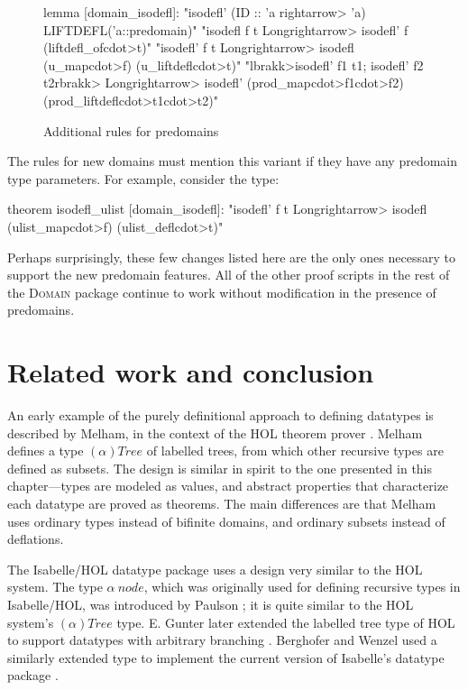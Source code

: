 \begin{figure}
\begin{isacode}
lemma [domain_isodefl]:
  "isodefl' (ID :: 'a \<rightarrow> 'a) LIFTDEFL('a::predomain)"
  "isodefl f t \<Longrightarrow> isodefl' f (liftdefl_of\<cdot>t)"
  "isodefl' f t \<Longrightarrow> isodefl (u_map\<cdot>f) (u_liftdefl\<cdot>t)"
  "\<lbrakk>isodefl' f1 t1; isodefl' f2 t2\<rbrakk> \<Longrightarrow> isodefl' (prod_map\<cdot>f1\<cdot>f2) (prod_liftdefl\<cdot>t1\<cdot>t2)"
\end{isacode}
\caption{Additional  rules for predomains}
\label{fig:universal-predomain-isodefl}
\end{figure}

The  rules for new domains must mention this variant if they have any predomain type parameters. For example, consider the  type:
\pagebreak
\begin{isacode}
theorem isodefl_ulist [domain_isodefl]:
  "isodefl' f t \<Longrightarrow> isodefl (ulist_map\<cdot>f) (ulist_defl\<cdot>t)"
\end{isacode}

Perhaps surprisingly, these few changes listed here are the only ones necessary to support the new predomain features. All of the other proof scripts in the rest of the \textsc{Domain} package continue to work without modification in the presence of predomains.

\section{Related work and conclusion}
\label{sec:universal-conclusion}

An early example of the purely definitional approach to defining datatypes is described by Melham, in the context of the HOL theorem prover \cite{melham89automating}. Melham defines a type $(\alpha)\mathit{Tree}$ of labelled trees, from which other recursive types are defined as subsets. The design is similar in spirit to the one presented in this chapter---types are modeled as values, and abstract properties that characterize each datatype are proved as theorems. The main differences are that Melham uses ordinary types instead of bifinite domains, and ordinary subsets instead of deflations.

The Isabelle/HOL datatype package uses a design very similar to the HOL system. The type $\alpha~\mathit{node}$, which was originally used for defining recursive types in Isabelle/HOL, was introduced by Paulson \cite{paulson97mechanizing}; it is quite similar to the HOL system's $(\alpha)\mathit{Tree}$ type. E. Gunter later extended the labelled tree type of HOL to support datatypes with arbitrary branching \cite{gunter94broader}. Berghofer and Wenzel used a similarly extended type to implement the current version of Isabelle's datatype package \cite{bw99inductivedatatypes}.

